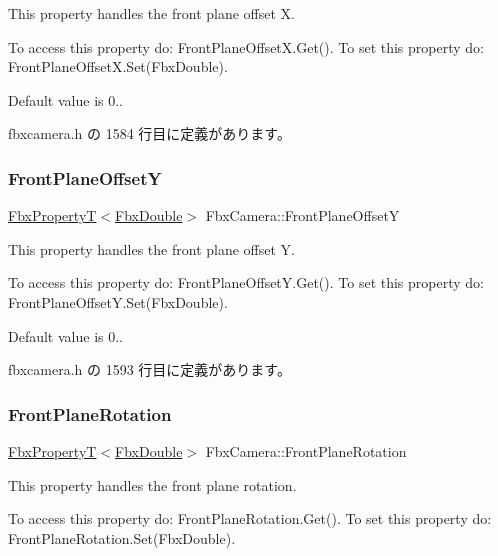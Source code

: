 This property handles the front plane offset X.

To access this property do\+: Front\+Plane\+Offset\+X.\+Get(). To set this property do\+: Front\+Plane\+Offset\+X.\+Set(\+Fbx\+Double).

Default value is 0.. 

 fbxcamera.\+h の 1584 行目に定義があります。

\mbox{\label{class_fbx_camera_acf005c234e34ef2b44fadf4db42be655}} 
\subsubsection{\texorpdfstring{Front\+Plane\+OffsetY}{FrontPlaneOffsetY}}
{\footnotesize\ttfamily \hyperlink{class_fbx_property_t}{Fbx\+PropertyT}$<$\hyperlink{fbxtypes_8h_a171e72a1c46fc15c1a6c9c31948c1c5b}{Fbx\+Double}$>$ Fbx\+Camera\+::\+Front\+Plane\+OffsetY}

This property handles the front plane offset Y.

To access this property do\+: Front\+Plane\+Offset\+Y.\+Get(). To set this property do\+: Front\+Plane\+Offset\+Y.\+Set(\+Fbx\+Double).

Default value is 0.. 

 fbxcamera.\+h の 1593 行目に定義があります。

\mbox{\label{class_fbx_camera_ac50922c82f1509c5f4f9e5c328ede671}} 
\subsubsection{\texorpdfstring{Front\+Plane\+Rotation}{FrontPlaneRotation}}
{\footnotesize\ttfamily \hyperlink{class_fbx_property_t}{Fbx\+PropertyT}$<$\hyperlink{fbxtypes_8h_a171e72a1c46fc15c1a6c9c31948c1c5b}{Fbx\+Double}$>$ Fbx\+Camera\+::\+Front\+Plane\+Rotation}

This property handles the front plane rotation.

To access this property do\+: Front\+Plane\+Rotation.\+Get(). To set this property do\+: Front\+Plane\+Rotation.\+Set(\+Fbx\+Double).

